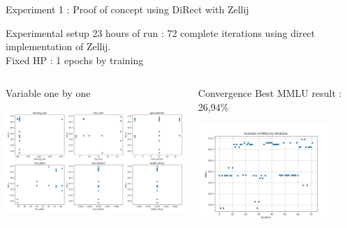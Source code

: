 \begin{frame}[allowframebreaks]{Experiment 1 : Proof of concept using DiRect with Zellij}
    \begin{block}{Experimental setup}
        23 hours of run : 72 complete iterations using direct implementation of Zellij.\\
        Fixed HP : 1 epochs by training\\
        
    \end{block}
    \begin{columns}
    
        \begin{column}[t]{0.6\textwidth}
            \begin{block}{Variable one by one}
            
                \includegraphics[width = 7.5cm]{imgs/individual_results.png}
            
            \end{block}   
        \end{column}

        \begin{column}[t]{0.4\textwidth}
            \begin{block}{Convergence}
            Best MMLU result : 26,94\%
            
        \includegraphics[width = 5cm]{imgs/mmlu_evolution.png}
            
            \end{block}  
            
        \end{column}
    \end{columns}    
\end{frame}

